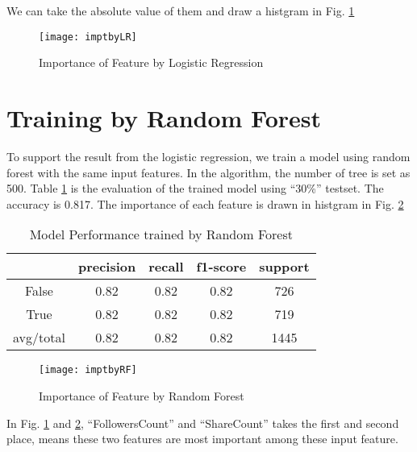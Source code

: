 We can take the absolute value of them and draw a histgram in Fig. \ref{fig:ImptbyLR}
\begin{figure}[h]\centering
\texttt{[image: imptbyLR]}
\caption{Importance of Feature by Logistic Regression} \label{fig:ImptbyLR} \end{figure}

\section{Training by Random Forest}
To support the result from the logistic regression, we train a model using random forest with the same input features. In the algorithm, the number of tree is set as 500. Table \ref{Table:PerformanceofRF} is the evaluation of the trained model using ``30\%'' testset. The accuracy is 0.817. The importance of each feature is drawn in histgram in Fig. \ref{fig:ImptbyRF}
\clearpage
\begin{table}[th] \centering 
\begin{tabular}{ccccc}
\toprule
& \textbf{precision} & \textbf{recall} & \textbf{f1-score} & \textbf{support}\\
\midrule
False & 0.82 & 0.82 & 0.82 & 726\\
True  & 0.82 & 0.82 & 0.82 & 719\\
avg/total & 0.82 & 0.82 & 0.82 & 1445\\
\bottomrule
\end{tabular}
\caption{Model Performance trained by Random Forest}
\label{Table:PerformanceofRF}
\end{table}
\begin{figure}[th]\centering
\texttt{[image: imptbyRF]}
\caption{Importance of Feature by Random Forest} \label{fig:ImptbyRF} \end{figure}

In Fig. \ref{fig:ImptbyLR} and \ref{fig:ImptbyRF}, ``FollowersCount'' and ``ShareCount'' takes the first and second place, means these two features are most important among these input feature.








